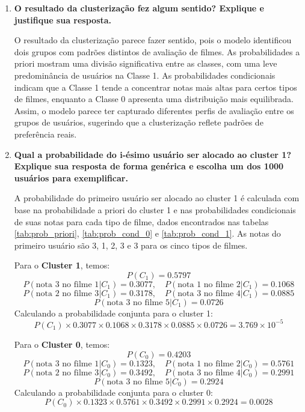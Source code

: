 \begin{enumerate}[label=(\alph*)]
    \item \textbf{O resultado da clusterização fez algum sentido? Explique e justifique sua resposta.}
    
    O resultado da clusterização parece fazer sentido, pois o modelo identificou dois grupos com padrões distintos de avaliação de filmes. As probabilidades a priori mostram uma divisão significativa entre as classes, com uma leve predominância de usuários na Classe 1. As probabilidades condicionais indicam que a Classe 1 tende a concentrar notas mais altas para certos tipos de filmes, enquanto a Classe 0 apresenta uma distribuição mais equilibrada. Assim, o modelo parece ter capturado diferentes perfis de avaliação entre os grupos de usuários, sugerindo que a clusterização reflete padrões de preferência reais.

    \item \textbf{Qual a probabilidade do i-ésimo usuário ser alocado ao cluster 1? Explique sua resposta de forma genérica e escolha um dos 1000 usuários para exemplificar.}
    
    A probabilidade do primeiro usuário ser alocado ao cluster 1 é calculada com base na probabilidade a priori do cluster 1 e nas probabilidades condicionais de suas notas para cada tipo de filme, dados encontrados nas tabelas \ref{tab:prob_priori}, \ref{tab:prob_cond_0} e \ref{tab:prob_cond_1}. As notas do primeiro usuário são 3, 1, 2, 3 e 3 para os cinco tipos de filmes.

    Para o \textbf{Cluster 1}, temos:
    \[
    P(C_1) = 0.5797
    \]
    \[
    P(\text{nota 3 no filme 1}|C_1) = 0.3077, \quad P(\text{nota 1 no filme 2}|C_1) = 0.1068
    \]
    \[
    P(\text{nota 2 no filme 3}|C_1) = 0.3178, \quad P(\text{nota 3 no filme 4}|C_1) = 0.0885
    \]
    \[
    P(\text{nota 3 no filme 5}|C_1) = 0.0726
    \]
    Calculando a probabilidade conjunta para o cluster 1:
    \[
    P(C_1) \times 0.3077 \times 0.1068 \times 0.3178 \times 0.0885 \times 0.0726 = 3.769 \times 10^{-5}
    \]
    
    Para o \textbf{Cluster 0}, temos:
    \[
    P(C_0) = 0.4203
    \]
    \[
    P(\text{nota 3 no filme 1}|C_0) = 0.1323, \quad P(\text{nota 1 no filme 2}|C_0) = 0.5761
    \]
    \[
    P(\text{nota 2 no filme 3}|C_0) = 0.3492, \quad P(\text{nota 3 no filme 4}|C_0) = 0.2991
    \]
    \[
    P(\text{nota 3 no filme 5}|C_0) = 0.2924
    \]
    Calculando a probabilidade conjunta para o cluster 0:
    \[
    P(C_0) \times 0.1323 \times 0.5761 \times 0.3492 \times 0.2991 \times 0.2924 = 0.0028
    \]
    

\end{enumerate}
